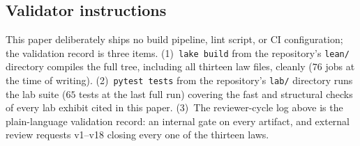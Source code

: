 \documentclass[11pt]{article}
\theoremstyle{definition}
\begin{document}
\subsection{Validator instructions}\label{subsec:validator-instructions}

This paper deliberately ships no build pipeline, lint script, or CI configuration; the validation
record is three items. (1)~\texttt{lake build} from the repository's \texttt{lean/} directory
compiles the full tree, including all thirteen law files, cleanly ($76$ jobs at the time of writing).
(2)~\texttt{pytest tests} from the repository's \texttt{lab/} directory runs the lab suite ($65$
tests at the last full run) covering the fast and structural checks of every lab exhibit cited in
this paper. (3)~The reviewer-cycle log above is the plain-language validation record: an internal
gate on every artifact, and external review requests v1--v18 closing every one of the thirteen laws.

\clearpage


\end{document}
